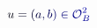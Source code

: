\documentclass[12pt]{article}
\begin{document}
\makeatletter
\renewcommand*{\@textcolor}[3]{%
  \protect\leavevmode
  \begingroup
    \color#1{#2}#3%
  \endgroup
}
\makeatother
\begin{displaymath}
\mathcolor[RGB]{0,0,15}{u} \mathcolor[RGB]{0,0,30}{=} \mathcolor[RGB]{0,0,45}{(} \mathcolor[RGB]{0,0,60}{a} \mathcolor[RGB]{0,0,75}{,} \mathcolor[RGB]{0,0,90}{b} \mathcolor[RGB]{0,0,105}{)} \mathcolor[RGB]{0,0,120}{\in} \mathcal { \mathcolor[RGB]{0,0,135}{O} } _ { \mathcolor[RGB]{0,0,150}{B} } ^ { \mathcolor[RGB]{0,0,165}{2} }
\end{displaymath}
\end{document}
